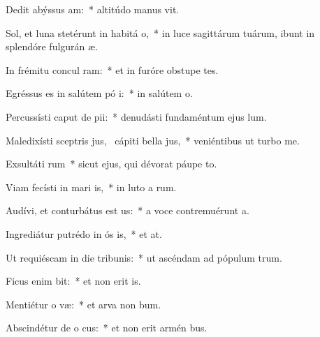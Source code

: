 \item Dedit abýssus  am:~* altitúdo manus  vit.
\item Sol, et luna stetérunt in habitá o,~* in luce sagittárum tuárum, ibunt in splendóre fulgurán  æ.
\item In frémitu concul ram:~* et in furóre obstupe tes.
\item Egréssus es in salútem pó i:~* in salútem   o.
\item Percussísti caput de  pii:~* denudásti fundaméntum ejus   lum.
\item Maledixísti sceptris jus,~\pscross{} cápiti bella jus,~* veniéntibus ut turbo   me.
\item Exsultáti rum~* sicut ejus, qui dévorat páupe  to.
\item Viam fecísti in mari  is,~* in luto a rum.
\item Audívi, et conturbátus est  us:~* a voce contremuérunt  a.
\item Ingrediátur putrédo in ós is,~* et   at.
\item Ut requiéscam in die tribunis:~* ut ascéndam ad pópulum  trum.
\item Ficus enim  bit:~* et non erit   is.
\item Mentiétur o væ:~* et arva non  bum.
\item Abscindétur de o cus:~* et non erit armén  bus.
